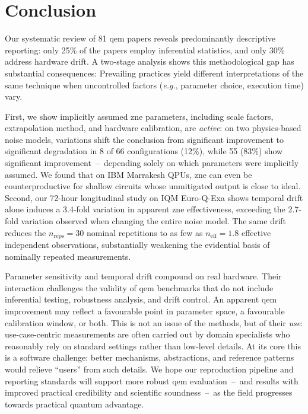 \documentclass[10pt,conference]{IEEEtran}
\newcommand{\eg}{\emph{e.g.}\xspace}
\begin{document}
\section{Conclusion}
\label{sec:conclusion}
Our systematic review of 81 \gls{qem} papers reveals predominantly descriptive reporting: only 25\% of the papers employ inferential statistics, and only 30\% address hardware drift. A two-stage analysis shows this methodological gap has substantial consequences: Prevailing practices yield different interpretations of the same technique when uncontrolled factors (\eg, parameter choice, execution time) vary.

First, we show implicitly assumed \gls{zne} parameters, including scale factors, extrapolation method, and hardware calibration, are \emph{active}: on two physics-based noise models, variations shift the conclusion from significant improvement to significant degradation in 8 of 66 configurations (12\%), while 55 (83\%) show significant improvement~--~depending solely on which parameters were implicitly assumed. We found that on IBM Marrakesh QPUs, \gls{zne} can even be counterproductive for shallow circuits whose unmitigated output is close to ideal. Second, our 72-hour longitudinal study on IQM Euro-Q-Exa shows temporal drift alone induces a 3.4-fold variation in apparent \gls{zne} effectiveness, exceeding the 2.7-fold variation observed when changing the entire noise model. The same drift reduces the $n_\text{reps} = 30$ nominal repetitions to as few as $n_\text{eff} = 1.8$ effective independent observations, substantially weakening the evidential basis of nominally repeated measurements.

Parameter sensitivity and temporal drift compound on real hardware. Their interaction challenges the validity of \gls{qem} benchmarks that do not include inferential testing, robustness analysis, and drift control. An apparent \gls{qem} improvement may reflect a favourable point in parameter space, a favourable calibration window, or both. This is not an issue of the methods, but of their \emph{use}: use-case-centric measurements are often carried out by domain specialists who reasonably rely on standard settings rather than low-level details. At its core this is a software challenge: better mechanisms, abstractions, and reference patterns would relieve \enquote{users} from such details. We hope our reproduction pipeline and reporting standards will support more robust \gls{qem} evaluation~--~and results with improved practical credibility and scientific soundness~--~as the field progresses towards practical quantum advantage.
\end{document}
